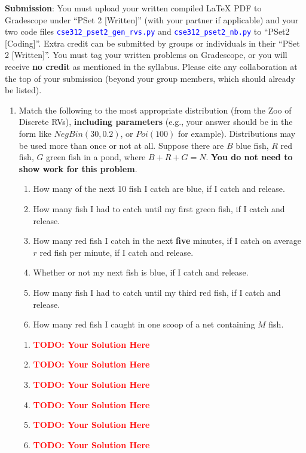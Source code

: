 \documentclass[12pt]{article}
\def\code#1{\textcolor{blue}{\texttt{#1}}}
\def\todo#1{\textcolor{red}{\textbf{#1}}}
\renewcommand{\|}{\mid}
\begin{document}
\textbf{Submission}: You must upload your written compiled LaTeX PDF to Gradescope under ``PSet 2 [Written]'' (with your partner if applicable) and your two code files \code{cse312\_pset2\_gen\_rvs.py} and \code{cse312\_pset2\_nb.py}  to ``PSet2 [Coding]''. Extra credit can be submitted by groups or individuals in their ``PSet 2 [Written]''. You must tag your written problems on Gradescope, or you will receive \textbf{no credit} as mentioned in the syllabus. Please cite any collaboration at the top of your submission (beyond your group members, which should already be listed).

\begin{enumerate}

    \item Match the following to the most appropriate distribution (from the Zoo of Discrete RVs), \textbf{including parameters} (e.g., your answer should be in the form like $NegBin(30, 0.2)$, or $Poi(100)$ for example). Distributions may be used more than once or not at all. Suppose there are $B$ blue fish, $R$ red fish, $G$ green fish in a pond, where $B+R+G=N$. \textbf{You do not need to show work for this problem}. 
    \begin{enumerate}
        \item How many of the next 10 fish I catch are blue, if I catch and release.
        \item How many fish I had to catch until my first green fish, if I catch and release.
        \item How many red fish I catch in the next \textbf{five} minutes, if I catch on average $r$ red fish per minute, if I catch and release.
        \item Whether or not my next fish is blue, if I catch and release.
        \item How many fish I had to catch until my third red fish, if I catch and release.
        \item How many red fish I caught in one scoop of a net containing $M$ fish.
    \end{enumerate}
    
\begin{tcolorbox}
\begin{enumerate}
\item \todo{TODO: Your Solution Here}
\item \todo{TODO: Your Solution Here}
\item \todo{TODO: Your Solution Here}
\item \todo{TODO: Your Solution Here}
\item \todo{TODO: Your Solution Here}
\item \todo{TODO: Your Solution Here}
\end{enumerate}
\end{tcolorbox}
    

\end{enumerate}
\end{document}
